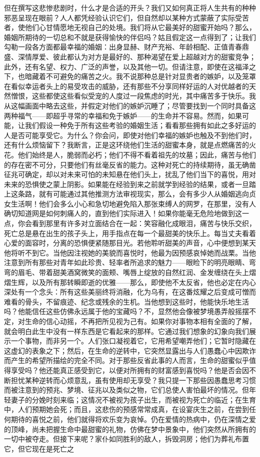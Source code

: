 但在撰写这悲惨悲剧时，什么才是合适的开头？我们又如何真正将人生共有的种种邪恶呈现在眼前？人人都凭经验认识它们，但自然却以某种方式蒙蔽了实际受苦者，使他们心甘情愿地无视自己的处境。我们将从它最美好的甜蜜开始吗？那么，婚姻所期待的一切总和不就是获得愉快的伴侣吗？姑且假定这一点得到了；让我们勾勒一段各方面都最幸福的婚姻：出身显赫、财产充裕、年龄相配、正值青春鼎盛、深情厚爱、彼此都认为对方是最好的、那种渴望在爱上超越对方的甜蜜竞争；此外，还有名望、权力、广泛的声誉，以及其他一切。但请注意，即使在这福泽之下，也暗藏着不可避免的痛苦之火。我不说那种总是针对显贵者的嫉妒，以及笼罩在看似幸运者头上的易受攻击的威胁，还有那些不分享同样好运的人对优越者的天然憎恨，这些都使这些看似受宠的人度过一段焦虑的时光，其中痛苦多于快乐。我从这幅画面中略去这些，并假定对他们的嫉妒沉睡了；尽管要找到一个同时具备这两种福气——即超乎寻常的幸福和免于嫉妒——的生命并不容易。然而，如果可能，让我们假设一种免于所有这些考验的婚姻生活；看看那些拥有如此之多好运的人是否可能享受它。为什么？你会问，即使对他们幸福的嫉妒也触及不到他们时，还有什么烦恼留下？我断言，正是这环绕他们生活的甜蜜本身，就是点燃痛苦的火花。他们始终是人，脆弱而必朽；他们不得不看着祖先的坟墓；因此，痛苦与他们的存在密不可分，只要他们有丝毫反省的能力。这种对死亡的持续期待，虽无确凿征兆可确定，却以对未来可怕的未知悬在他们头上，扰乱了他们当下的喜悦，用对未来的恐惧使之蒙上阴影。如果能在经验到来之前就学到经验的结果，或者一旦踏上这条路，就有可能通过其他推测方法审视现实，那么，会有多少人从婚姻逃向贞女生活啊！他们会多么小心和急切地避免陷入那张束缚人的网罗，在那里，没有人确切知道网是如何刺痛人的，直到他们实际进入！如果你能毫无危险地做到这一点，你会看到那里有许多对立面结合在一起：笑容融化成眼泪，痛苦与快乐交织，死亡总是悬在出生的孩子头上，用手指点在每一个最甜美的快乐上。每当丈夫看着心爱的面容时，分离的恐惧便紧随那目光。若他聆听甜美的声音，心中便想到某天他将听不到它。当他因注视她的美貌而喜悦时，他最为因预感哀悼她而战栗。当他注意到所有那些对青年如此珍贵、轻率者所追求的魅力——眼睑下的明亮眼睛、弯弯的眉毛、带着甜美酒窝微笑的面颊、嘴唇上绽放的自然红润、金发缠绕在头上熠熠生辉，以及所有那转瞬即逝的优雅——那么，即使他不太反省，他也必定在内心深处有一个念头：所有这些美丽终将消融，化为乌有，在这番炫耀之后变成可憎而难看的骨头，不留痕迹、纪念或残余的生机。当他想到这些时，他能快乐地生活吗？他能信任这些仿佛永远属于他的宝藏吗？不，显然他会像被梦境愚弄般摇摆不定，对生命的信心动摇，不再把所见视为己有。如果你对事物本相有全面的了解，就会明白此生中没有一样东西是它看起来的那样。它通过我们想象的幻象向我们展示一个事物，而非另一个。人们张口凝视着它，它用希望嘲弄他们；它暂时隐藏在这虚幻的表象之下；然后，在生命的逆转中，它突然显露出与人们愚蠢心中因欺诈而产生的希望所描绘的完全不同。对于那些反省此事的人而言，生命的甜蜜似乎值得享受吗？他还能真正感受到它，以便对所拥有的财富感到喜悦吗？他是否会因不断担忧某种逆转而心烦意乱，虽有使用却无享受？我只提一下那些因愚蠢思考习惯而被注意到的预兆、梦境、征兆以及类似之物，它们总使人害怕最坏的情况。但年轻妻子的分娩时刻来临；这情况不被视为孩子出生，而被视为死亡的临近；在生育中，人们预期她会死；而且，这悲伤的预感常常成真，在设宴庆生之前，在尝到任何期待的喜悦之前，他们就得将欢乐变为哀悼。仍在爱情的热病中，仍在深情之爱的顶峰，尚未把握生命中最甜蜜的礼物，仿佛在梦中景象中，他们突然从所拥有的一切中被夺走。但接下来呢？家仆如同胜利的敌人，拆毁洞房；他们为葬礼布置它，但它现在是死亡之